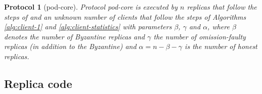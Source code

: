 \documentclass[pdflatex,sn-mathphys-num]{sn-jnl}%
\theoremstyle{thmstyleone}%
\theoremstyle{thmstyletwo}%
\theoremstyle{thmstylethree}%
\newtheorem{protocol}{Protocol}
\newcommand{\podtm}{\textsf{pod}\xspace}
\newcommand{\identify}[1]{\ensuremath{\mathsf{identify}(#1)}\xspace}
\let\oldalpha\alpha
\renewcommand{\alpha}{\ensuremath{\oldalpha}\xspace}
\let\oldbeta\beta
\renewcommand{\beta}{\ensuremath{\oldbeta}\xspace}
\let\oldgamma\gamma
\renewcommand{\gamma}{\ensuremath{\oldgamma}\xspace}
\begin{document}
\begin{protocol}[\podtm-core]\label{const:pod-core}
     Protocol \podtm-core is executed by $n$ replicas that follow the steps of  and an unknown number of clients that follow the steps of Algorithms \ref{alg:client-1} and \ref{alg:client-statistics} with parameters \beta, \gamma and \alpha, where \beta denotes the number of Byzantine replicas and \gamma the number of omission-faulty replicas (in addition to the Byzantine) and $\alpha = n - \beta - \gamma$ is the number of honest replicas.
\end{protocol}


\subsection{Replica code}
\end{document}
